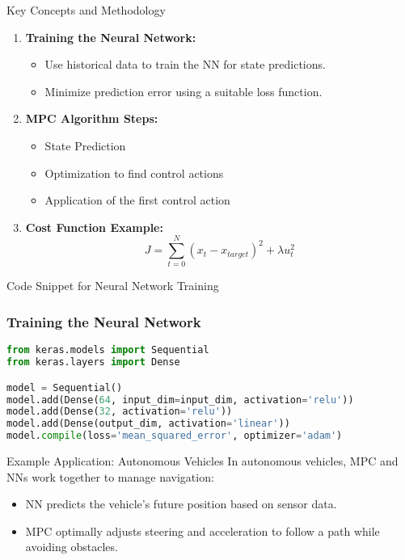 \documentclass[aspectratio=169]{beamer}
\begin{document}
\begin{frame}{Key Concepts and Methodology}
    \begin{enumerate}
        \item \textbf{Training the Neural Network:}
        \begin{itemize}
            \item Use historical data to train the NN for state predictions.
            \item Minimize prediction error using a suitable loss function.
        \end{itemize}
        
        \item \textbf{MPC Algorithm Steps:}
        \begin{itemize}
            \item State Prediction
            \item Optimization to find control actions
            \item Application of the first control action
        \end{itemize}

        \item \textbf{Cost Function Example:}
        \begin{equation}
            J = \sum_{t=0}^{N} (x_t - x_{target})^2 + \lambda u_t^2
        \end{equation}
    \end{enumerate}
\end{frame}

\begin{frame}[fragile]{Code Snippet for Neural Network Training}
    \frametitle{Training the Neural Network}
    \begin{lstlisting}[language=Python]
from keras.models import Sequential
from keras.layers import Dense

model = Sequential()
model.add(Dense(64, input_dim=input_dim, activation='relu'))
model.add(Dense(32, activation='relu'))
model.add(Dense(output_dim, activation='linear'))
model.compile(loss='mean_squared_error', optimizer='adam')
    \end{lstlisting}
\end{frame}

\begin{frame}{Example Application: Autonomous Vehicles}
    In autonomous vehicles, MPC and NNs work together to manage navigation:
    \begin{itemize}
        \item NN predicts the vehicle's future position based on sensor data.
        \item MPC optimally adjusts steering and acceleration to follow a path while avoiding obstacles.
    \end{itemize}
\end{frame}
\end{document}
